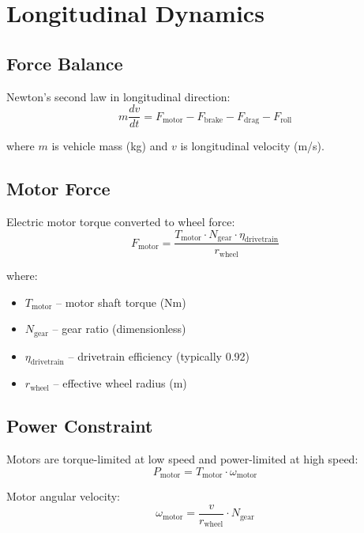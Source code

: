 \documentclass[11pt,a4paper]{article}
\begin{document}
\section{Longitudinal Dynamics}

\subsection{Force Balance}

Newton's second law in longitudinal direction:
\begin{equation}
m \frac{dv}{dt} = F_{\text{motor}} - F_{\text{brake}} - F_{\text{drag}} - F_{\text{roll}}
\end{equation}

where $m$ is vehicle mass (kg) and $v$ is longitudinal velocity (m/s).

\subsection{Motor Force}

Electric motor torque converted to wheel force:
\begin{equation}
F_{\text{motor}} = \frac{T_{\text{motor}} \cdot N_{\text{gear}} \cdot \eta_{\text{drivetrain}}}{r_{\text{wheel}}}
\end{equation}

where:
\begin{itemize}
    \item $T_{\text{motor}}$ -- motor shaft torque (Nm)
    \item $N_{\text{gear}}$ -- gear ratio (dimensionless)
    \item $\eta_{\text{drivetrain}}$ -- drivetrain efficiency (typically 0.92)
    \item $r_{\text{wheel}}$ -- effective wheel radius (m)
\end{itemize}

\subsection{Power Constraint}

Motors are torque-limited at low speed and power-limited at high speed:
\begin{equation}
P_{\text{motor}} = T_{\text{motor}} \cdot \omega_{\text{motor}}
\end{equation}

Motor angular velocity:
\begin{equation}
\omega_{\text{motor}} = \frac{v}{r_{\text{wheel}}} \cdot N_{\text{gear}}
\end{equation}
\end{document}
